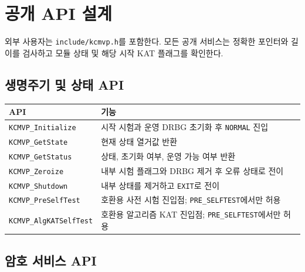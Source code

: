 \documentclass[11pt,a4paper]{article}
\begin{document}
\section{공개 API 설계}

외부 사용자는 \texttt{include/kcmvp.h}를 포함한다. 모든 공개 서비스는
정확한 포인터와 길이를 검사하고 모듈 상태 및 해당 시작 KAT 플래그를 확인한다.

\subsection{생명주기 및 상태 API}

\begin{longtable}{p{}p{}}
\toprule
API & 기능 \\
\midrule
\endhead
\texttt{KCMVP\_Initialize} & 시작 시험과 운영 DRBG 초기화 후 \texttt{NORMAL} 진입 \\
\texttt{KCMVP\_GetState} & 현재 상태 열거값 반환 \\
\texttt{KCMVP\_GetStatus} & 상태, 초기화 여부, 운영 가능 여부 반환 \\
\texttt{KCMVP\_Zeroize} & 내부 시험 플래그와 DRBG 제거 후 오류 상태로 전이 \\
\texttt{KCMVP\_Shutdown} & 내부 상태를 제거하고 \texttt{EXIT}로 전이 \\
\texttt{KCMVP\_PreSelfTest} & 호환용 사전 시험 진입점; \texttt{PRE\_SELFTEST}에서만 허용 \\
\texttt{KCMVP\_AlgKATSelfTest} & 호환용 알고리즘 KAT 진입점; \texttt{PRE\_SELFTEST}에서만 허용 \\
\bottomrule
\end{longtable}

\subsection{암호 서비스 API}
\end{document}

